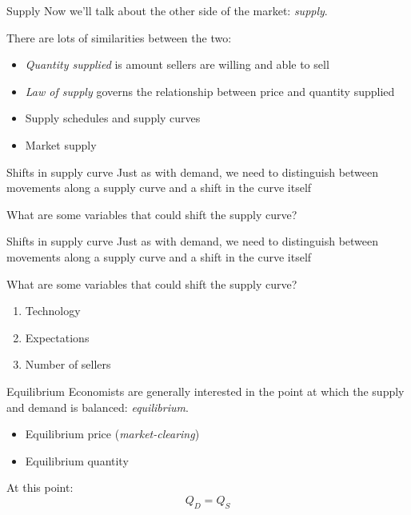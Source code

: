 \documentclass[aspectratio=169]{beamer}
\begin{document}
  \begin{frame}{Supply}
    Now we'll talk about the other side of the market: \textit{supply}.

    \medskip

    There are lots of similarities between the two:
    \begin{itemize}
        \item \textit{Quantity supplied} is amount sellers are willing and able to sell
        \item \textit{Law of supply} governs the relationship between price and quantity supplied
        \item Supply schedules and supply curves
        \item Market supply
    \end{itemize}
\end{frame}

\begin{frame}{Shifts in supply curve}
   Just as with demand, we need to distinguish between movements along a supply curve and a shift in the curve itself

   \medskip

   What are some variables that could shift the supply curve?
\end{frame}

\begin{frame}{Shifts in supply curve}
    Just as with demand, we need to distinguish between movements along a supply curve and a shift in the curve itself

   \medskip
   
   What are some variables that could shift the supply curve?
    
    \begin{enumerate}
        \item Technology
        \item Expectations
        \item Number of sellers
    \end{enumerate}
 \end{frame}

 \begin{frame}{Equilibrium}
    Economists are generally interested in the point at which the supply and demand is balanced: \textit{equilibrium}.
    \begin{itemize}
        \item Equilibrium price (\textit{market-clearing})
        \item Equilibrium quantity
    \end{itemize}

    At this point:
    $$
    Q_D = Q_S
    $$
\end{frame}
\end{document}
